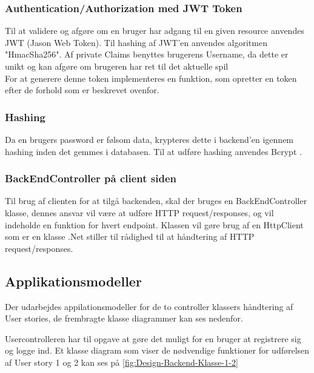 \subsubsection{Authentication/Authorization med JWT Token}
Til at validere og afgøre om en bruger har adgang til en given resource anvendes JWT (Jason Web Token). Til hashing af JWT'en anvendes algoritmen "HmacSha256". Af private Claims benyttes brugerens Username, da dette er unikt og kan afgøre om brugeren har ret til det aktuelle spil\\

For at generere denne token implementeres en funktion, som opretter en token efter de forhold som er beskrevet ovenfor.\\


\subsubsection{Hashing}
\label{sssec: Hashing}
Da en brugers password er følsom data, krypteres dette i backend'en igennem hashing inden det gemmes i databasen. Til at udføre hashing anvendes Bcrypt \cite{Bcrypt}.


\subsubsection{BackEndController på client siden}
Til brug af clienten for at tilgå backenden, skal der bruges en BackEndController klasse, dennes ansvar vil være at udføre HTTP request/responses, og vil indeholde en funktion for hvert endpoint. Klassen vil gøre brug af en HttpClient som er en klasse .Net stiller til rådighed til at håndtering af HTTP request/responses.


\subsection{Applikationsmodeller}
Der udarbejdes appilationsmodeller for de to controller klassers håndtering af User stories, de frembragte klasse diagrammer kan ses nedenfor.

Usercontrolleren har til opgave at gøre det muligt for en bruger at registrere sig og logge ind. Et klasse diagram som viser de nødvendige funktioner for udførelsen af User story 1 og 2 kan ses på \autoref{fig:Design-Backend-Klasse-1-2}


